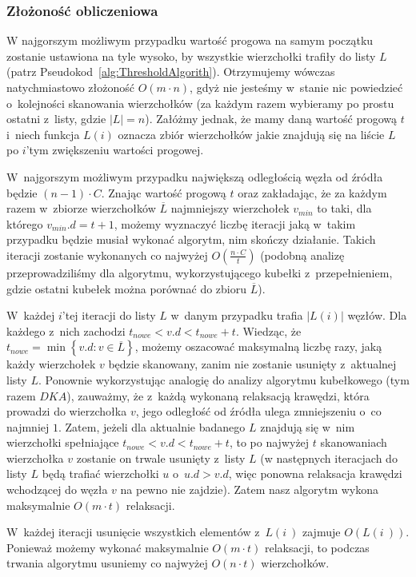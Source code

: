 \subsubsection{Złożoność obliczeniowa}


W najgorszym możliwym przypadku wartość progowa na samym początku zostanie ustawiona na tyle wysoko, by wszystkie wierzchołki trafiły do listy $L$ (patrz Pseudokod~\ref{alg:ThresholdAlgorith}).
Otrzymujemy wówczas natychmiastowo złożoność $O \left( m \cdot n \right)$, gdyż nie jesteśmy w~stanie nic powiedzieć o~kolejności skanowania wierzchołków (za każdym razem wybieramy po prostu ostatni z~listy, gdzie $ \left| L \right| = n $).
Załóżmy jednak, że mamy daną wartość progową $t$ i~niech funkcja $L \left( i \right)$ oznacza zbiór wierzchołków jakie znajdują się na liście $L$ po $i$'tym zwiększeniu wartości progowej.

\begin{myitemize}
	\item W~najgorszym możliwym przypadku największą odległością węzła od źródła będzie $\left( n - 1 \right) \cdot C$.
	Znając wartość progową $t$ oraz zakładając, że za każdym razem w~zbiorze wierzchołków $\overline{L}$ najmniejszy wierzchołek $v_{min}$ to taki, dla którego $v_{min}.d = t + 1$, możemy wyznaczyć liczbę iteracji jaką w~takim przypadku będzie musiał wykonać algorytm, nim skończy działanie.
	Takich iteracji zostanie wykonanych co najwyżej $O \left( \frac{n \cdot C}{t}\right)$ (podobną analizę przeprowadziliśmy dla algorytmu, wykorzystującego kubełki z~przepełnieniem, gdzie ostatni kubełek można porównać do zbioru $\overline{L}$).
	\item W~każdej $i$'tej iteracji do listy $L$ w~danym przypadku trafia $\left| L \left( i \right) \right|$ węzłów.
	Dla każdego z~nich zachodzi $t_{nowe} < v.d < t_{nowe} + t$.
	Wiedząc, że $t_{nowe} = \min \left\{ v.d : v \in \overline{L} \right\}$, możemy oszacować maksymalną liczbę razy, jaką każdy wierzchołek $v$ będzie skanowany, zanim nie zostanie usunięty z~aktualnej listy $L$.
	Ponownie wykorzystując analogię do analizy algorytmu kubełkowego (tym razem $DKA$), zauważmy, że z~każdą wykonaną relaksacją krawędzi, która prowadzi do wierzchołka $v$, jego odległość od źródła ulega zmniejszeniu o~co najmniej $1$.
	Zatem, jeżeli dla aktualnie badanego $L$ znajdują się w~nim wierzchołki spełniające $t_{nowe} < v.d < t_{nowe} + t$, to po najwyżej $t$ skanowaniach wierzchołka $v$ zostanie on trwale usunięty z~listy $L$ (w następnych iteracjach do listy $L$ będą trafiać wierzchołki $u$ o~$u.d > v.d$, więc ponowna relaksacja krawędzi wchodzącej do węzła $v$ na pewno nie zajdzie).
	Zatem nasz algorytm wykona maksymalnie $O \left( m \cdot t \right)$ relaksacji.
	\item W~każdej iteracji usunięcie wszystkich elementów z~$L \left( i~\right)$ zajmuje $O \left( L \left( i~\right) \right)$.
	Ponieważ możemy wykonać maksymalnie $O \left( m \cdot t \right)$ relaksacji, to podczas trwania algorytmu usuniemy co najwyżej $O \left( n \cdot t \right)$ wierzchołków.
\end{myitemize}

